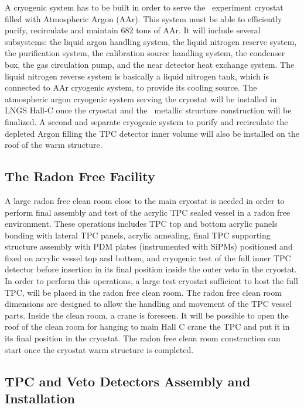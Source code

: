 A cryogenic system has to be built in order to serve the \DSks\ experiment cryostat
filled with Atmospheric Argon (AAr). This system must be able to efficiently purify,
recirculate and maintain 682 tons of AAr. It will include several subsystems: the liquid argon handling system, the liquid nitrogen reserve system, the purification system, the calibration source handling system, the condenser box, the gas circulation pump, and the near detector heat exchange system.
The liquid nitrogen reverse system is basically a liquid nitrogen tank, which is connected to AAr cryogenic system, to provide its cooling source.
The atmospheric argon cryogenic system serving the cryostat will be installed in LNGS Hall-C once the cryostat and the \DSks\ metallic structure construction will be finalized. A second and separate cryogenic system to purify and recirculate the depleted Argon filling the TPC detector inner volume will also be installed on the roof of the warm structure.

\subsection{The Radon Free Facility}
\label{sec:RadonFreeCleanRoom}

A large radon free clean room close to the main cryostat is needed in order to perform final assembly and test of the acrylic TPC sealed vessel in a radon free environment. These operations includes TPC top and bottom acrylic panels bonding with lateral TPC panels, acrylic annealing, final TPC supporting structure assembly with PDM plates (instrumented with SiPMs) positioned and fixed on acrylic vessel top and bottom, and cryogenic test of the full inner TPC detector before insertion in its final position inside the outer veto in the cryostat. In order to perform this operations, a large test cryostat sufficient to host the full TPC, will be placed in the radon free clean room. The radon free clean room dimensions are designed to allow the handling and movement of the TPC vessel parts. Inside the clean room, a crane is foreseen. It will be possible to open the roof of the clean room for hanging to main Hall C crane the TPC and put it in its final position in the cryostat. The radon free clean room construction can start once the cryostat warm structure is completed.

\subsection{TPC and Veto Detectors Assembly and Installation}
\label{sec:TPCAndVetoAssembly}


